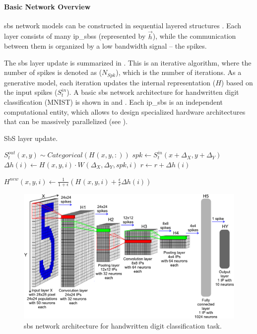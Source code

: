 \paragraph{Basic Network Overview}

\gls{sbs} network models can be constructed in sequential layered structures \cite{rotermund2019Backpropagation}. Each layer consists of many \glspl{ip_sbs} (represented by $\vec{h}$), while the communication between them is organized by a low bandwidth signal -- the spikes.

The \gls{sbs} layer update is summarized in . This is an iterative algorithm, where the number of spikes is denoted as ($N_{Spk}$), which is the number of iterations. As a generative model, each iteration updates the internal representation ($H$) based on the input spikes ($S^{in}_t$). A basic \gls{sbs} network architecture for handwritten digit classification (MNIST) is shown in  and . Each \gls{ip_sbs} is an independent computational entity, which allows to design specialized hardware architectures that can be massively parallelized (see ).


\begin{algorithm}
	\caption{SbS layer update.}\label{alg:sbs}
	
	\begin{algorithmic}[1]
		\STATE $S^{out}_t(x, y) \sim Categorical( H^{}(x, y, :) ) $
		\STATE $spk \leftarrow S^{in}_t(x + \Delta_X , y + \Delta_Y)$
		\STATE $\Delta h(i)
		\leftarrow H^{}(x, y,  i) \cdot W^{}(\Delta_X, \Delta_Y, spk, i)$
		\STATE $r \leftarrow r + \Delta h(i)$
		\ENDFOR
		
		\STATE $H^{new}(x, y, i) \leftarrow \frac{1}{1+\epsilon} \left( H^{}(x, y, i) + \frac{\epsilon}{r} \Delta h(i) \right) $              
		\ENDFOR
		\ENDFOR
		\ENDFOR
		\ENDFOR
	\end{algorithmic} 
\end{algorithm}

\begin{figure}
	\centering
	\includegraphics[width=0.5\columnwidth]{./chapters/sbs_accelerator/figures/sbs_network.pdf}
	\caption{\gls{sbs} network architecture for handwritten digit classification task.}
	\label{fig:sbs_network}
\end{figure}


